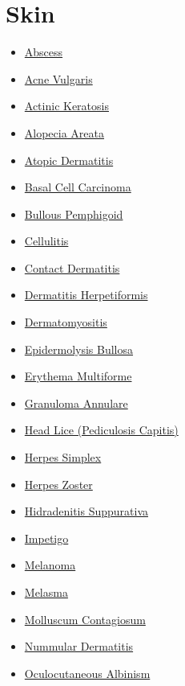 \section*{Skin}
\label{sec:organ_skin}
\begin{itemize}[noitemsep]
  \item \hyperlink{sec:Abscess}{Abscess}
  \item \hyperlink{sec:Acne Vulgaris}{Acne Vulgaris}
  \item \hyperlink{sec:Actinic Keratosis}{Actinic Keratosis}
  \item \hyperlink{sec:Alopecia Areata}{Alopecia Areata}
  \item \hyperlink{sec:Atopic Dermatitis}{Atopic Dermatitis}
  \item \hyperlink{sec:Basal Cell Carcinoma}{Basal Cell Carcinoma}
  \item \hyperlink{sec:Bullous Pemphigoid}{Bullous Pemphigoid}
  \item \hyperlink{sec:Cellulitis}{Cellulitis}
  \item \hyperlink{sec:Contact Dermatitis}{Contact Dermatitis}
  \item \hyperlink{sec:Dermatitis Herpetiformis}{Dermatitis Herpetiformis}
  \item \hyperlink{sec:skin:Dermatomyositis}{Dermatomyositis}
  \item \hyperlink{sec:Epidermolysis Bullosa}{Epidermolysis Bullosa}
  \item \hyperlink{sec:Erythema Multiforme}{Erythema Multiforme}
  \item \hyperlink{sec:Granuloma Annulare}{Granuloma Annulare}
  \item \hyperlink{sec:Head Lice}{Head Lice (Pediculosis Capitis)}
  \item \hyperlink{sec:Herpes Simplex}{Herpes Simplex}
  \item \hyperlink{sec:Herpes Zoster}{Herpes Zoster}
  \item \hyperlink{sec:Hidradenitis Suppurativa}{Hidradenitis Suppurativa}
  \item \hyperlink{sec:Impetigo}{Impetigo}
  \item \hyperlink{sec:Melanoma}{Melanoma}
  \item \hyperlink{sec:Melasma}{Melasma}
  \item \hyperlink{sec:Molluscum Contagiosum}{Molluscum Contagiosum}
  \item \hyperlink{sec:Nummular Dermatitis}{Nummular Dermatitis}
  \item \hyperlink{sec:Oculocutaneous Albinism}{Oculocutaneous Albinism}

\end{itemize}
